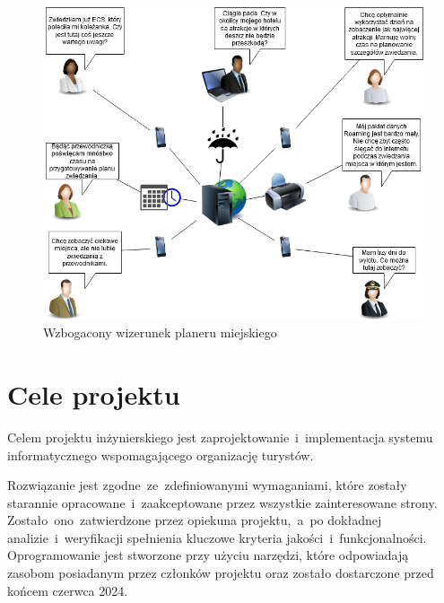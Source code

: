 \begin{figure}[h]
    \centering
    \includegraphics[width=1\textwidth]{attachments/rich-picture}
    \caption{Wzbogacony wizerunek planeru miejskiego}
    \label{fig:rich-picture}
\end{figure}

\pagebreak
\section{Cele projektu}
\label{sec:cele-projektu}

Celem projektu inżynierskiego jest zaprojektowanie~i~implementacja systemu informatycznego wspomagającego organizację turystów.

Rozwiązanie jest zgodne~ze~zdefiniowanymi wymaganiami, które zostały starannie opracowane~i~zaakceptowane przez wszystkie zainteresowane strony.
Zostało~ono~zatwierdzone przez opiekuna projektu,~a~po dokładnej analizie~i~weryfikacji spełnienia kluczowe kryteria jakości~i~funkcjonalności.
Oprogramowanie jest stworzone przy użyciu narzędzi, które odpowiadają zasobom posiadanym przez członków projektu oraz zostało dostarczone przed końcem czerwca 2024.

